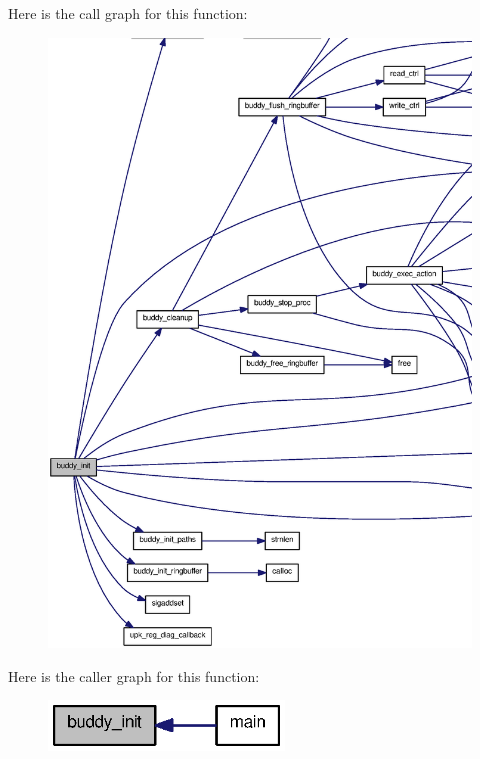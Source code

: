 Here is the call graph for this function:
\nopagebreak
\begin{figure}[H]
\begin{center}
\leavevmode
\includegraphics[width=400pt]{buddy_8c_a8243634d0b4e7fe2b2ece3c97bbbd060_cgraph}
\end{center}
\end{figure}




Here is the caller graph for this function:\nopagebreak
\begin{figure}[H]
\begin{center}
\leavevmode
\includegraphics[width=178pt]{buddy_8c_a8243634d0b4e7fe2b2ece3c97bbbd060_icgraph}
\end{center}
\end{figure}


